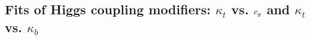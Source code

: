 






\toggledclearpage
\subsection{Fits of Higgs coupling modifiers: \texorpdfstring{$\kappa_t$}{kt} vs. \texorpdfstring{$c_g$}{cg} and \texorpdfstring{$\kappa_t$}{kt} vs. \texorpdfstring{$\kappa_b$}{kb}}



